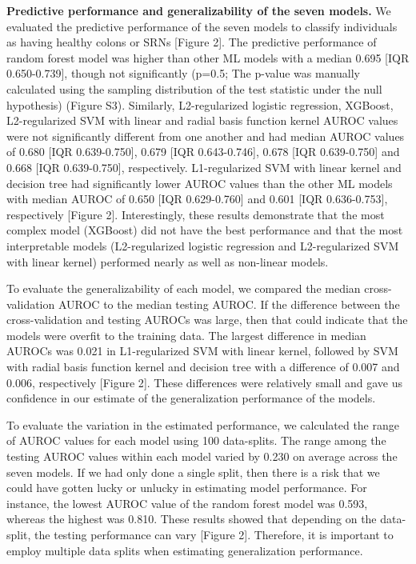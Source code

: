 \documentclass[11pt,]{article}
\begin{document}
\textbf{Predictive performance and generalizability of the seven
models.} We evaluated the predictive performance of the seven models to
classify individuals as having healthy colons or SRNs {[}Figure 2{]}.
The predictive performance of random forest model was higher than other
ML models with a median 0.695 {[}IQR 0.650-0.739{]}, though not
significantly (p=0.5; The p-value was manually calculated using the
sampling distribution of the test statistic under the null hypothesis)
(Figure S3). Similarly, L2-regularized logistic regression, XGBoost,
L2-regularized SVM with linear and radial basis function kernel AUROC
values were not significantly different from one another and had median
AUROC values of 0.680 {[}IQR 0.639-0.750{]}, 0.679 {[}IQR
0.643-0.746{]}, 0.678 {[}IQR 0.639-0.750{]} and 0.668 {[}IQR
0.639-0.750{]}, respectively. L1-regularized SVM with linear kernel and
decision tree had significantly lower AUROC values than the other ML
models with median AUROC of 0.650 {[}IQR 0.629-0.760{]} and 0.601 {[}IQR
0.636-0.753{]}, respectively {[}Figure 2{]}. Interestingly, these
results demonstrate that the most complex model (XGBoost) did not have
the best performance and that the most interpretable models
(L2-regularized logistic regression and L2-regularized SVM with linear
kernel) performed nearly as well as non-linear models.

To evaluate the generalizability of each model, we compared the median
cross-validation AUROC to the median testing AUROC. If the difference
between the cross-validation and testing AUROCs was large, then that
could indicate that the models were overfit to the training data. The
largest difference in median AUROCs was 0.021 in L1-regularized SVM with
linear kernel, followed by SVM with radial basis function kernel and
decision tree with a difference of 0.007 and 0.006, respectively
{[}Figure 2{]}. These differences were relatively small and gave us
confidence in our estimate of the generalization performance of the
models.

To evaluate the variation in the estimated performance, we calculated
the range of AUROC values for each model using 100 data-splits. The
range among the testing AUROC values within each model varied by 0.230
on average across the seven models. If we had only done a single split,
then there is a risk that we could have gotten lucky or unlucky in
estimating model performance. For instance, the lowest AUROC value of
the random forest model was 0.593, whereas the highest was 0.810. These
results showed that depending on the data-split, the testing performance
can vary {[}Figure 2{]}. Therefore, it is important to employ multiple
data splits when estimating generalization performance.
\end{document}
